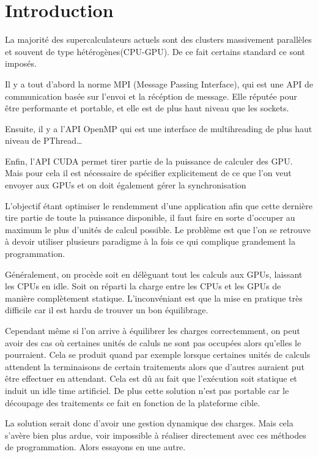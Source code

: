 \documentclass[smallextended]{svjour3}
\begin{document}
\section{Introduction}
\label{sec-1}

La majorité des supercalculateurs actuels sont des clusters
massivement parallèles et souvent de type
hétérogènes(CPU-GPU). De ce fait certains standard ce sont
imposés. 

Il y a tout d'abord la norme MPI (Message Passing Interface),
qui est une API de communication basée sur l'envoi et la
récéption de message. Elle réputée pour être performante et
portable, et elle est de plus haut niveau que les sockets.

Ensuite, il y a l'API OpenMP qui est une interface de
multihreading de plus haut niveau de PThread\ldots{}

Enfin, l'API CUDA permet tirer partie de la puissance de calculer
des GPU. Mais pour cela il est nécessaire de spécifier
explicitement de ce que l'on veut envoyer aux GPUs et on doit
également gérer la synchronisation 

L'objectif étant optimiser le rendemment d'une application afin
que cette dernière tire partie de toute la puissance disponible, il faut
faire en sorte d'occuper au maximum le plus d'unités de calcul possible.
Le problème est que l'on se retrouve à devoir utiliser plusieurs
paradigme à la fois ce qui complique grandement la
programmation.

Généralement, on procède soit en délèguant tout 
les calculs aux GPUs, laissant les CPUs en idle. Soit on réparti
la charge entre les CPUs et les GPUs de manière complètement
statique. L'inconvéniant est que la mise en pratique très
difficile car il est hardu de trouver un bon équilibrage. 

Cependant même si l'on arrive à équilibrer les charges
correctemment, on peut avoir des cas où certaines unités de
caluls ne sont pas occupées alors qu'elles le pourraient. Cela se
produit quand par exemple lorsque certaines unités de calculs
attendent la terminaisons de certain traitements alors que
d'autres auraient put être effectuer en attendant. Cela est dû au
fait que l'exécution soit statique et induit un idle time
artificiel. De plus cette solution n'est pas portable car le
découpage des traitements ce fait en fonction de la plateforme
cible.

La solution serait donc d'avoir une gestion dynamique des
charges. Mais cela s'avère bien plus ardue, voir impossible
à réaliser directement avec ces méthodes de programmation. Alors
essayons en une autre.
\end{document}
